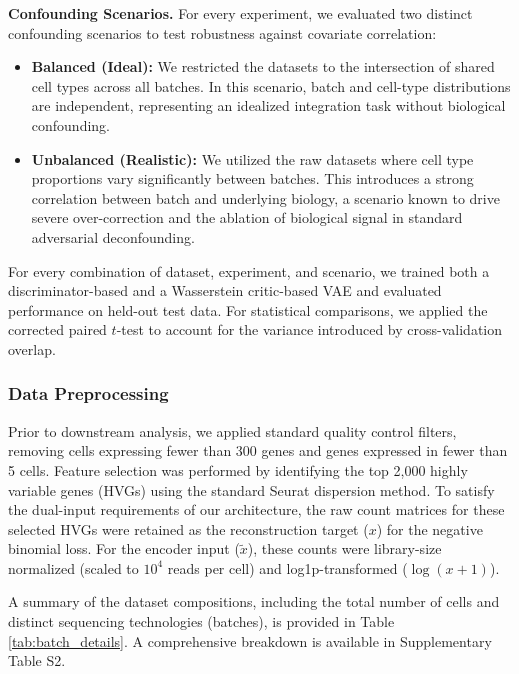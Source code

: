 \documentclass[unnumsec,webpdf,contemporary,large]{oup-authoring-template}%
\theoremstyle{thmstyleone}%
\theoremstyle{thmstyletwo}%
\theoremstyle{thmstylethree}%
\begin{document}
\textbf{Confounding Scenarios.} For every experiment, we evaluated two distinct confounding scenarios to test robustness against covariate correlation:
\begin{itemize}
    \item \textbf{Balanced (Ideal):} We restricted the datasets to the intersection of shared cell types across all batches. In this scenario, batch and cell-type distributions are independent, representing an idealized integration task without biological confounding.
    \item \textbf{Unbalanced (Realistic):} We utilized the raw datasets where cell type proportions vary significantly between batches. This introduces a strong correlation between batch and underlying biology, a scenario known to drive severe over-correction and the ablation of biological signal in standard adversarial deconfounding.
\end{itemize}

For every combination of dataset, experiment, and scenario, we trained both a discriminator-based and a Wasserstein critic-based VAE and evaluated performance on held-out test data. For statistical comparisons, we applied the corrected paired $t$-test \citep{Nadeau2003-vp} to account for the variance introduced by cross-validation overlap.

\subsubsection{Data Preprocessing}
Prior to downstream analysis, we applied standard quality control filters, removing cells expressing fewer than 300 genes and genes expressed in fewer than 5 cells. Feature selection was performed by identifying the top 2,000 highly variable genes (HVGs) using the standard Seurat dispersion method. To satisfy the dual-input requirements of our architecture, the raw count matrices for these selected HVGs were retained as the reconstruction target ($x$) for the negative binomial loss. For the encoder input ($\tilde{x}$), these counts were library-size normalized (scaled to $10^4$ reads per cell) and log1p-transformed ($\log(x+1)$).

A summary of the dataset compositions, including the total number of cells and distinct sequencing technologies (batches), is provided in Table \ref{tab:batch_details}. A comprehensive breakdown is available in Supplementary Table S2.
\end{document}
